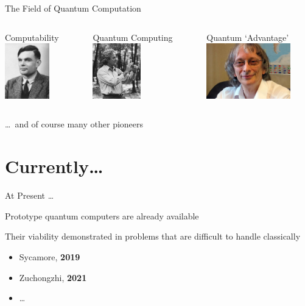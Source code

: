 \documentclass{beamer}
\begin{document}
\begin{frame}{The Field of Quantum Computation}
  \begin{columns}[c]
  \begin{column}{0.33\textwidth}
          \centering
          \small{Computability} \\
          \includegraphics[height=2.4cm]{images/turing.jpg}
  \end{column}
  \begin{column}{0.33\textwidth}
          \centering
          \small{Quantum Computing} \\
          \includegraphics[height=2.4cm]{images/feynman.jpg}
  \end{column}
  \begin{column}{0.4\textwidth}
          \centering
          \small{Quantum `Advantage'} \\
          \includegraphics[height=2.4cm]{images/deutsch.jpg}
  \end{column}
  \end{columns}

  \vspace{1cm}
  \dots\ and of course many other pioneers
\end{frame}

\section{Currently\dots}

\begin{frame}{At Present \dots}

        Prototype quantum computers are already available 

        Their viability demonstrated in problems that are difficult to
        handle classically 

        \begin{itemize}
                \item Sycamore, \textbf{2019}
                \item Zuchongzhi, \textbf{2021}
                \item \dots
        \end{itemize}

\end{frame}
\end{document}
